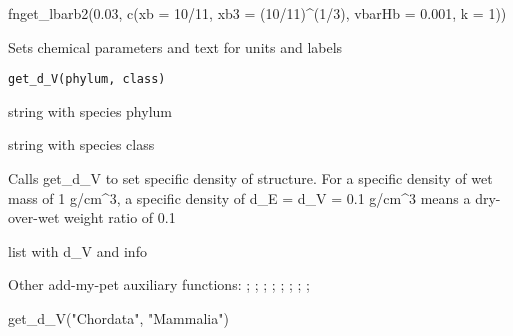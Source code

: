 \documentclass[a4paper]{book}
\begin{document}
%
\begin{Examples}
\begin{ExampleCode}
fnget_lbarb2(0.03, c(xb = 10/11, xb3 = (10/11)^(1/3), vbarHb = 0.001, k = 1))
\end{ExampleCode}
\end{Examples}
%
\begin{Description}\relax
Sets chemical parameters and text for units and labels
\end{Description}
%
\begin{Usage}
\begin{verbatim}
get_d_V(phylum, class)
\end{verbatim}
\end{Usage}
%
\begin{Arguments}
\begin{ldescription}
\item[\code{phylum}] string with species phylum

\item[\code{class}] string with species class
\end{ldescription}
\end{Arguments}
%
\begin{Details}\relax
Calls get\_d\_V to set specific density of structure. For a specific density of wet mass of 1 g/cm\textasciicircum{}3,
a specific density of d\_E = d\_V = 0.1 g/cm\textasciicircum{}3 means a dry-over-wet weight ratio of 0.1
\end{Details}
%
\begin{Value}
list with d\_V and info
\end{Value}
%
\begin{SeeAlso}\relax
Other add-my-pet auxiliary functions: ;
; ;
; ;
;
;
; 
\end{SeeAlso}
%
\begin{Examples}
\begin{ExampleCode}
get_d_V("Chordata", "Mammalia")
\end{ExampleCode}
\end{Examples}
\end{document}
